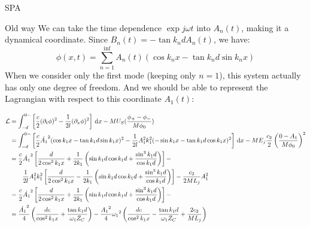\documentclass[12pt,a4paper]{article}
\begin{document}
\begin{section}{SPA}
\begin{subsection}{Old way}
We can take the time dependence $\exp{j\omega t}$ into $A_n(t)$, making it a dynamical coordinate. Since $B_n(t) = - \tan k_n d A_n(t)$, we have: 
\begin{equation}
\phi(x,t) = \sum_{n=1}^\inf{A_n(t) ( \cos k_n x - \tan k_n d \sin k_n x)} 
\end{equation}
When we consider only the first mode (keeping only $n=1$), this system actually has only one degree of freedom. And we should be able to represent the Lagrangian with respect to this coordinate $A_1(t)$: 

\begin{equation}
\begin{aligned}
\Lagrangian &= \integral{\left[ \frac{c}{2}(\dt{\phi})^2 - \frac{1}{2l} (\dx{\phi})^2 \right]}{x}{-d}{0-} - M U_S(\frac{\phi_+ - \phi_-}{M\phi_0})\\
&= \integral{\left[\frac{c}{2}\dot{A_1}^2( \cos k_1 x - \tan k_1 d \sin k_1 x)^2 - \frac{1}{2l} A_1^2 k_1^2(-\sin k_1 x - \tan k_1 d \cos k_1 x)^2\right]}{x}{-d}{0-} - M E_j \frac{c_2}{2} \left(\frac{0 - A_1}{M\phi_0}\right)^2\\
&= \frac{c}{2}\dot{A_1}^2\left[ \frac{d}{2\cos^2 k_1 x} + \frac{1}{2 k_1} \left(\sin k_1 d \cos k_1 d + \frac{\sin^3 k_1 d}{\cos k_1 d}\right) \right] - \\
&\qquad  \frac{1}{2l} A_1^2 k_1^2 \left[ \frac{d}{2\cos^2 k_1 x} - \frac{1}{2 k_1} \left(\sin k_1 d \cos k_1 d + \frac{\sin^3 k_1 d}{\cos k_1 d}\right) \right] - \frac{c_2}{2ML_j} A_1^2 \\
&= \frac{c}{2}\dot{A_1}^2\left[ \frac{d}{2\cos^2 k_1 x} + \frac{1}{2 k_1} \left(\sin k_1 d \cos k_1 d + \frac{\sin^3 k_1 d}{\cos k_1 d}\right) \right] - \\
&= \frac{\dot{A_1}^2}{4} \left( \frac{d c}{\cos^2 k_1 x} + \frac{\tan k_1 d}{\omega_1 Z_C}\right) - \frac{{A_1}^2}{4} {\omega_1}^2  \left( \frac{d c}{\cos^2 k_1 x} - \frac{\tan k_1 d}{\omega_1 Z_C} + \frac{2c_2}{ML_j} \right)
\end{aligned}
\end{equation}


\end{subsection}
\end{section}
\end{document}

